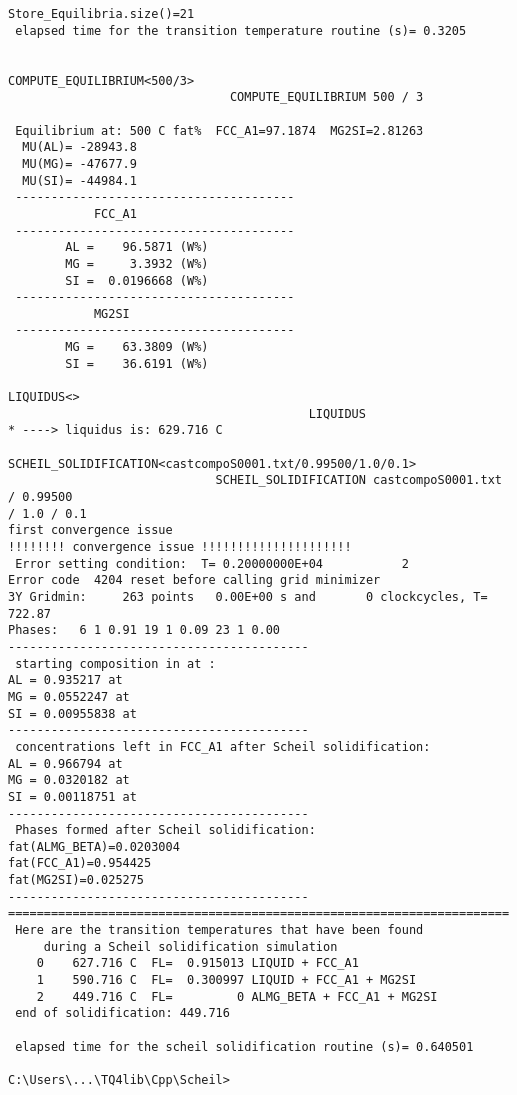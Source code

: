 \documentclass[12pt]{article}
\begin{document}
{\begin{verbatim}
Store_Equilibria.size()=21
 elapsed time for the transition temperature routine (s)= 0.3205


COMPUTE_EQUILIBRIUM<500/3>
                               COMPUTE_EQUILIBRIUM 500 / 3

 Equilibrium at: 500 C fat%  FCC_A1=97.1874  MG2SI=2.81263
  MU(AL)= -28943.8
  MU(MG)= -47677.9
  MU(SI)= -44984.1
 ---------------------------------------
            FCC_A1
 ---------------------------------------
        AL =    96.5871 (W%)
        MG =     3.3932 (W%)
        SI =  0.0196668 (W%)
 ---------------------------------------
            MG2SI
 ---------------------------------------
        MG =    63.3809 (W%)
        SI =    36.6191 (W%)

LIQUIDUS<>
                                          LIQUIDUS
* ----> liquidus is: 629.716 C

SCHEIL_SOLIDIFICATION<castcompoS0001.txt/0.99500/1.0/0.1>
                             SCHEIL_SOLIDIFICATION castcompoS0001.txt / 0.99500
/ 1.0 / 0.1
first convergence issue
!!!!!!!! convergence issue !!!!!!!!!!!!!!!!!!!!!
 Error setting condition:  T= 0.20000000E+04           2
Error code  4204 reset before calling grid minimizer
3Y Gridmin:     263 points   0.00E+00 s and       0 clockcycles, T=  722.87
Phases:   6 1 0.91 19 1 0.09 23 1 0.00
------------------------------------------
 starting composition in at :
AL = 0.935217 at
MG = 0.0552247 at
SI = 0.00955838 at
------------------------------------------
 concentrations left in FCC_A1 after Scheil solidification:
AL = 0.966794 at
MG = 0.0320182 at
SI = 0.00118751 at
------------------------------------------
 Phases formed after Scheil solidification:
fat(ALMG_BETA)=0.0203004
fat(FCC_A1)=0.954425
fat(MG2SI)=0.025275
------------------------------------------
======================================================================
 Here are the transition temperatures that have been found
     during a Scheil solidification simulation
    0    627.716 C  FL=  0.915013 LIQUID + FCC_A1
    1    590.716 C  FL=  0.300997 LIQUID + FCC_A1 + MG2SI
    2    449.716 C  FL=         0 ALMG_BETA + FCC_A1 + MG2SI
 end of solidification: 449.716

 elapsed time for the scheil solidification routine (s)= 0.640501

C:\Users\...\TQ4lib\Cpp\Scheil>
\end{verbatim}}
\end{document}
